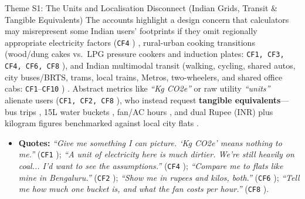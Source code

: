 \documentclass[12pt, a4paper]{article}
\begin{document}
\begin{semanticcard}{Theme S1: The Units and Localisation Disconnect (Indian Grids, Transit \& Tangible Equivalents)}
The accounts highlight a design concern that calculators may misrepresent some Indian users' footprints if they omit regionally appropriate electricity factors (\texttt{CF4} \cite{cf4}) \cite{lee2021, hoffmann2024}, rural-urban cooking transitions (wood/dung cakes vs.\ LPG pressure cookers and induction plates: \texttt{CF1, CF3, CF4, CF6, CF8} \cite{cf1, cf3, cf4, cf6, cf8}), and Indian multimodal transit (walking, cycling, shared autos, city buses/BRTS, trams, local trains, Metros, two-wheelers, and shared office cabs: \texttt{CF1}--\texttt{CF10} \cite{cf1, cf2, cf4, cf5, cf7, cf10}) \cite{lee2021, grinstein2018, mohanty2023, dash2023, gandhi2025}. Abstract metrics like \textit{``Kg CO2e''} or raw utility \textit{``units''} alienate users (\texttt{CF1, CF2, CF8} \cite{cf1, cf2, cf8}), who instead request \textbf{tangible equivalents}---bus trips \cite{cf1}, 15L water buckets \cite{cf1, cf3, cf8}, fan/AC hours \cite{cf2, cf3, cf8}, and dual Rupee (INR) plus kilogram figures \cite{cf6, cf8} benchmarked against local city flats \cite{cf2}.
\begin{itemize}
    \item \textbf{Quotes:} \textit{``Give me something I can picture. `Kg CO2e' means nothing to me.''} (\texttt{CF1} \cite{cf1}); \textit{``A unit of electricity here is much dirtier. We're still heavily on coal... I'd want to see the assumptions.''} (\texttt{CF4} \cite{cf4}); \textit{``Compare me to flats like mine in Bengaluru.''} (\texttt{CF2} \cite{cf2}); \textit{``Show me in rupees and kilos, both.''} (\texttt{CF6} \cite{cf6}); \textit{``Tell me how much one bucket is, and what the fan costs per hour.''} (\texttt{CF8} \cite{cf8}).
\end{itemize}
\end{semanticcard}
\end{document}
